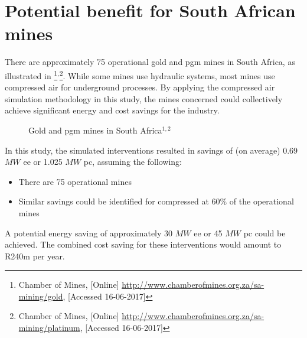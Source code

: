 \section{Potential benefit for South African mines}
There are approximately 75 operational gold and \gls{pgm} mines in South Africa, as illustrated in \footnote{Chamber of Mines, [Online] \url{http://www.chamberofmines.org.za/sa-mining/gold}, [Accessed 16-06-2017]}$^,$\footnote{Chamber of Mines, [Online] \url{http://www.chamberofmines.org.za/sa-mining/platinum}, [Accessed 16-06-2017]}. While some mines use hydraulic systems, most mines use compressed air for underground processes. By applying the compressed air simulation methodology in this study, the mines concerned could collectively achieve significant energy and cost savings for the industry. 
\par 
	\begin{figure}[h!]
		\centering
		\caption[Gold and Platinum group metal mines in South Africa]{Gold and \gls{pgm} mines in South Africa$^{1,2}$}
		\label{fig: Mine map}
	\end{figure}
In this study, the simulated interventions resulted in savings of (on average) 0.69 $MW$ \gls{ee} or 1.025 $ MW $ \gls{pc}, assuming the following:
\begin{itemize}
	\item There are 75 operational mines
	\item Similar savings could be identified for compressed at 60\% of the operational mines
\end{itemize} 
A potential energy saving of approximately 30 $MW$ \gls{ee} or 45 $ MW $ \gls{pc} could be achieved. The combined cost saving for these interventions would amount to R240m per year. 

